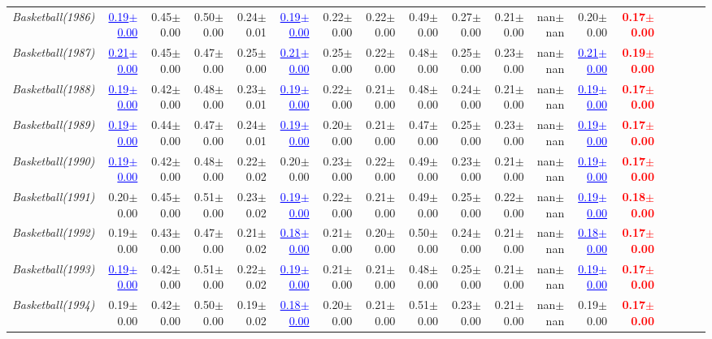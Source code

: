 \documentclass[nohyperref]{article}
\theoremstyle{plain}
\theoremstyle{definition}
\theoremstyle{remark}
\newcommand{\red}[1]{\textcolor{red}{\textbf{#1}}}
\newcommand{\blue}[1]{\textcolor{blue}{\underline{#1}}}
\begin{document}
\begin{table*}[!ht]
{\begin{tabular}{lrrrrrrrrrrrrrrrrr}
			{\it Basketball(1986)} & \blue{0.19$\pm$0.00} & 0.45$\pm$0.00 & 0.50$\pm$0.00 & 0.24$\pm$0.01 & \blue{0.19$\pm$0.00} & 0.22$\pm$0.00 & 0.22$\pm$0.00 & 0.49$\pm$0.00 & 0.27$\pm$0.00 & 0.21$\pm$0.00 & nan$\pm$nan & 0.20$\pm$0.00 & \red{0.17$\pm$0.00} \\
			{\it Basketball(1987)} & \blue{0.21$\pm$0.00} & 0.45$\pm$0.00 & 0.47$\pm$0.00 & 0.25$\pm$0.00 & \blue{0.21$\pm$0.00} & 0.25$\pm$0.00 & 0.22$\pm$0.00 & 0.48$\pm$0.00 & 0.25$\pm$0.00 & 0.23$\pm$0.00 & nan$\pm$nan & \blue{0.21$\pm$0.00} & \red{0.19$\pm$0.00} \\
			{\it Basketball(1988)} & \blue{0.19$\pm$0.00} & 0.42$\pm$0.00 & 0.48$\pm$0.00 & 0.23$\pm$0.01 & \blue{0.19$\pm$0.00} & 0.22$\pm$0.00 & 0.21$\pm$0.00 & 0.48$\pm$0.00 & 0.24$\pm$0.00 & 0.21$\pm$0.00 & nan$\pm$nan & \blue{0.19$\pm$0.00} & \red{0.17$\pm$0.00} \\
			{\it Basketball(1989)} & \blue{0.19$\pm$0.00} & 0.44$\pm$0.00 & 0.47$\pm$0.00 & 0.24$\pm$0.01 & \blue{0.19$\pm$0.00} & 0.20$\pm$0.00 & 0.21$\pm$0.00 & 0.47$\pm$0.00 & 0.25$\pm$0.00 & 0.23$\pm$0.00 & nan$\pm$nan & \blue{0.19$\pm$0.00} & \red{0.17$\pm$0.00} \\
			{\it Basketball(1990)} & \blue{0.19$\pm$0.00} & 0.42$\pm$0.00 & 0.48$\pm$0.00 & 0.22$\pm$0.02 & 0.20$\pm$0.00 & 0.23$\pm$0.00 & 0.22$\pm$0.00 & 0.49$\pm$0.00 & 0.23$\pm$0.00 & 0.21$\pm$0.00 & nan$\pm$nan & \blue{0.19$\pm$0.00} & \red{0.17$\pm$0.00} \\
			{\it Basketball(1991)} & 0.20$\pm$0.00 & 0.45$\pm$0.00 & 0.51$\pm$0.00 & 0.23$\pm$0.02 & \blue{0.19$\pm$0.00} & 0.22$\pm$0.00 & 0.21$\pm$0.00 & 0.49$\pm$0.00 & 0.25$\pm$0.00 & 0.22$\pm$0.00 & nan$\pm$nan & \blue{0.19$\pm$0.00} & \red{0.18$\pm$0.00} \\
			{\it Basketball(1992)} & 0.19$\pm$0.00 & 0.43$\pm$0.00 & 0.47$\pm$0.00 & 0.21$\pm$0.02 & \blue{0.18$\pm$0.00} & 0.21$\pm$0.00 & 0.20$\pm$0.00 & 0.50$\pm$0.00 & 0.24$\pm$0.00 & 0.21$\pm$0.00 & nan$\pm$nan & \blue{0.18$\pm$0.00} & \red{0.17$\pm$0.00} \\
			{\it Basketball(1993)} & \blue{0.19$\pm$0.00} & 0.42$\pm$0.00 & 0.51$\pm$0.00 & 0.22$\pm$0.02 & \blue{0.19$\pm$0.00} & 0.21$\pm$0.00 & 0.21$\pm$0.00 & 0.48$\pm$0.00 & 0.25$\pm$0.00 & 0.21$\pm$0.00 & nan$\pm$nan & \blue{0.19$\pm$0.00} & \red{0.17$\pm$0.00} \\
			{\it Basketball(1994)} & 0.19$\pm$0.00 & 0.42$\pm$0.00 & 0.50$\pm$0.00 & 0.19$\pm$0.02 & \blue{0.18$\pm$0.00} & 0.20$\pm$0.00 & 0.21$\pm$0.00 & 0.51$\pm$0.00 & 0.23$\pm$0.00 & 0.21$\pm$0.00 & nan$\pm$nan & 0.19$\pm$0.00 & \red{0.17$\pm$0.00} \\

\end{tabular}}
\end{table*}
\end{document}
